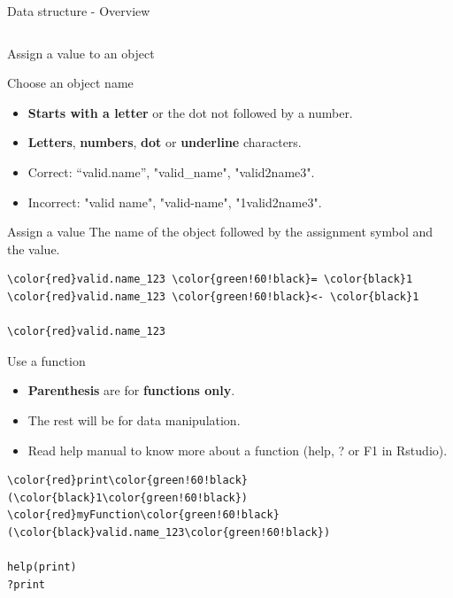 \documentclass[10pt]{beamer}
\begin{document}
\begin{frame}{Data structure - Overview}
\begin{columns}
\begin{column}{.2\textwidth}
    \end{column}
  \end{columns}
\end{frame}


\begin{frame}[fragile]{Assign a value to an object}
  \begin{block}{Choose an object name}
    \begin{itemize}
    \item {\bf Starts with a letter} or the dot not followed by a number.
    \item {\bf Letters}, {\bf numbers}, {\bf dot} or {\bf underline} characters.
    \item Correct: ``{\sf valid.name}'', "{\sf valid\_name}", "{\sf valid2name3}".
    \item Incorrect: "{\sf valid name}", "{\sf valid-name}", "{\sf 1valid2name3}".
    \end{itemize}
  \end{block}
  \begin{block}{Assign a value}
    The name of the object followed by the assignment symbol and the value.
    \medskip
\begin{Verbatim}[commandchars=\\\{\}]
\color{red}valid.name_123 \color{green!60!black}= \color{black}1
\color{red}valid.name_123 \color{green!60!black}<- \color{black}1

\color{red}valid.name_123
\end{Verbatim}
  \end{block}
\end{frame}

\begin{frame}[fragile]{Use a function}

  \begin{block}{}
    \begin{itemize}
    \item {\bf Parenthesis} are for {\bf functions only}.
    \item The rest will be for data manipulation.
    \item Read help manual to know more about a function ({\sf help}, {\sf ?} or {\sf F1} in Rstudio).
    \end{itemize}
  \end{block}

\bigskip

\begin{Verbatim}[commandchars=\\\{\}]
\color{red}print\color{green!60!black}(\color{black}1\color{green!60!black})
\color{red}myFunction\color{green!60!black}(\color{black}valid.name_123\color{green!60!black})

help(print)
?print
\end{Verbatim}

\end{frame}
\end{document}
